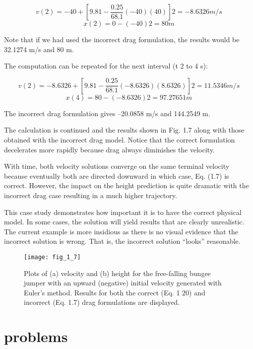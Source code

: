 \documentclass[../main.tex]{subfiles}
\begin{document}
$$v(2)= -40 + \left[ 9.81 - \dfrac{0.25}{68.1}(-40)(40) \right]2= -8.6326 m/s $$
$$x(2)=0 - (-40)2=80 m$$

 Note that if we had used the incorrect drag formulation, the results would be 32.1274 m/s
and 80 m. 

The computation can be repeated for the next interval (t  2 to 4 s):

$$v(2)= -8.6326 + \left[ 9.81 - \dfrac{0.25}{68.1}(-8.6326)(8.6326) \right]2= 11.5346 m/s $$
$$x(4) =80 -(-8.6326)2=97.27651 m $$


The incorrect drag formulation gives –20.0858 m/s and 144.2549 m.


The calculation is continued and the results shown in Fig. 1.7 along with those
obtained with the incorrect drag model. Notice that the correct formulation decelerates
more rapidly because drag always diminishes the velocity.


With time, both velocity solutions converge on the same terminal velocity because
eventually both are directed downward in which case, Eq. (1.7) is correct. However, the
impact on the height prediction is quite dramatic with the incorrect drag case resulting in a
much higher trajectory.


This case study demonstrates how important it is to have the correct physical model.
In some cases, the solution will yield results that are clearly unrealistic. The current example is more insidious as there is no visual evidence that the incorrect solution is wrong. That
is, the incorrect solution “looks” reasonable.

\begin{figure}[H]
	\centering
	\texttt{[image: fig\_1\_7]}
   \caption{\textsf{Plots of (a) velocity and (b) height for the free-falling bungee jumper with an upward (negative)
   initial velocity generated with Euler's method. Results for both the correct (Eq. 1 20) and incorrect
   (Eq. 1.7) drag formulations are displayed.}}
   \label{fig_1_7}
\end{figure}

\section*{problems}
\end{document}

